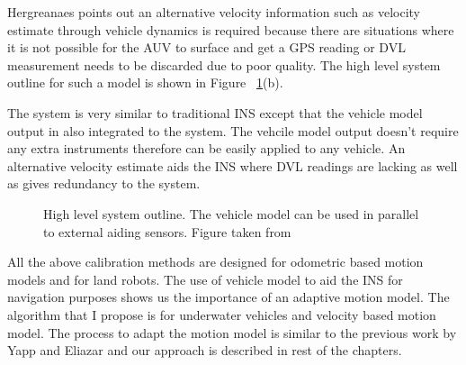 \documentclass[12pt]{dalcsthesis}
\begin{document}
Hergreanaes \cite{Hegrenæs2008} points out an alternative velocity information such as velocity estimate through vehicle dynamics is required because there are situations where it is not possible for the AUV to surface and get a GPS reading or DVL measurement needs to be discarded due to poor quality. The high level system outline for such a model is shown in Figure ~\ref{fig-INS systems}(b).

The system is very similar to traditional INS except that the vehicle model output in also integrated to the system. The vehcile model output doesn't require any extra instruments therefore can be easily applied to any vehicle. An alternative velocity estimate aids the INS where DVL readings are lacking as well as gives redundancy to the system. 




\begin{figure}
  \centering
  \qquad
 
  \caption{\label{fig-INS systems}High level system outline. The vehicle model can be used in parallel to external aiding sensors. Figure taken from \cite{Hegrenæs2008}}
\end{figure}

All the above calibration methods are designed for odometric based motion models and for land robots. The use of vehicle model to aid the INS for navigation purposes shows us the importance of an adaptive motion model. The algorithm that I propose is for underwater vehicles and velocity based motion model. The process to adapt the motion model is similar to the previous work by Yapp and Eliazar and our approach is described in rest of the chapters.
\end{document}
